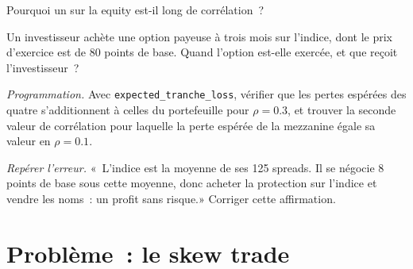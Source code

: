 \begin{exercise}[$\star\star$]\label{exo:m2:credit-indices-and-tranches:5}
Pourquoi un  sur la  equity est-il long de corrélation~?
\end{exercise}

\begin{exercise}[$\star\star$]\label{exo:m2:credit-indices-and-tranches:6}
Un investisseur achète une option payeuse à trois mois sur l'indice, dont le prix d'exercice est de 80 points de base.
Quand l'option est-elle exercée, et que reçoit l'investisseur~?
\end{exercise}

\begin{exercise}[$\star\star\star$]\label{exo:m2:credit-indices-and-tranches:7}
\emph{Programmation.} Avec \texttt{expected\_tranche\_loss}, vérifier que les pertes espérées des quatre 
s'additionnent à celles du portefeuille pour $\rho = 0.3$, et trouver la seconde
valeur de corrélation pour laquelle la perte espérée de la  mezzanine égale sa valeur en $\rho = 0.1$.
\end{exercise}

\begin{exercise}[$\star\star\star$]\label{exo:m2:credit-indices-and-tranches:8}
\emph{Repérer l'erreur.} «~L'indice est la moyenne de ses 125 spreads. Il se négocie 8 points de base
sous cette moyenne, donc acheter la protection sur l'indice et vendre les noms~: un profit sans
risque.» Corriger cette affirmation.
\end{exercise}

\section{Problème~: le skew trade}

